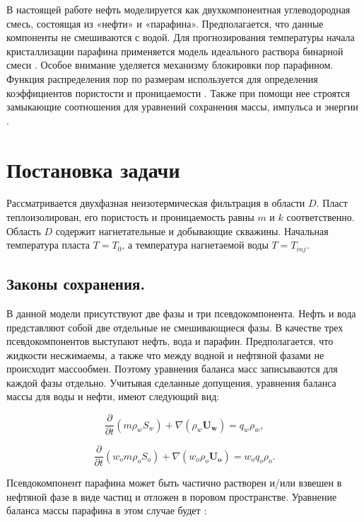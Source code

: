 \documentclass[12pt,twoside,a4paper]{uz_ku}
\begin{document}
	В настоящей работе нефть моделируется как двухкомпонентная углеводородная смесь, состоящая из «нефти» и «парафина». Предполагается, что данные компоненты не смешиваются с водой. Для прогнозирования температуры начала кристаллизации парафина применяется модель идеального раствора бинарной смеси \cite{8}. Особое внимание уделяется механизму блокировки пор парафином. Функция распределения пор по размерам используется для определения коэффициентов пористости и проницаемости \cite{4}. Также при помощи нее строятся замыкающие соотношения для уравнений сохранения массы, импульса и энергии \cite{4, 11, 12}. 

\section{Постановка задачи}
	Рассматривается двухфазная неизотермическая фильтрация в области $D$. Пласт теплоизолирован, его пористость и проницаемость равны $m$ и $k$ соответственно. Область $D$ содержит нагнетательные и добывающие скважины. Начальная температура пласта $T=T_0$, а температура нагнетаемой воды $T=T_{inj}$.

\subsection{Законы сохранения. } 
	В данной модели присутствуют две фазы и три псевдокомпонента. Нефть и вода представляют собой две отдельные не смешивающиеся фазы. В качестве трех псевдокомпонентов выступают нефть, вода и парафин. Предполагается, что жидкости несжимаемы, а также что между водной и нефтяной фазами не происходит массообмен. Поэтому уравнения баланса масс записываются для каждой фазы отдельно. Учитывая сделанные допущения, уравнения баланса массы для воды и нефти, имеют следующий вид:
	
\begin{equation}\label{eq1}
\frac{\partial }{\partial t}(m \rho_w S_w ) + \nabla(\rho_w \mathbf{U_w}) = q_w \rho_w,
\end{equation}

\begin{equation}\label{eq2}
\frac{\partial }{\partial t}(w_o  m \rho_o S_o) + \nabla(w_o \rho_o \mathbf{U_o}) = w_o q_o \rho_o.
\end{equation}

	Псевдокомпонент парафина может быть частично растворен и/или взвешен в нефтяной фазе в виде частиц и отложен в поровом пространстве. Уравнение баланса массы парафина в этом случае будет \cite{6}:
\end{document}
